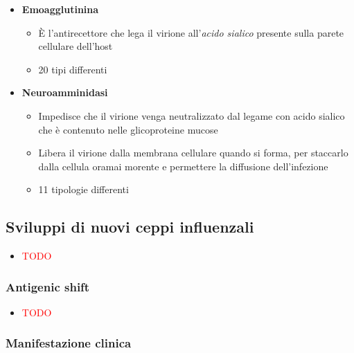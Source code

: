 \documentclass[italian,]{article}
\providecommand{\tightlist}{%
  \setlength{\itemsep}{0pt}\setlength{\parskip}{0pt}}
\newcommand{\TODO}[1]{\textcolor{red}{\textsf{\footnotesize{TODO #1}}}} %
\begin{document}
\begin{itemize}
\tightlist
\item
  \textbf{Emoagglutinina}

  \begin{itemize}
  \tightlist
  \item
    È l'antirecettore che lega il virione all'\emph{acido sialico}
    presente sulla parete cellulare dell'host
  \item
    20 tipi differenti
  \end{itemize}
\item
  \textbf{Neuroamminidasi}

  \begin{itemize}
  \tightlist
  \item
    Impedisce che il virione venga neutralizzato dal legame con acido
    sialico che è contenuto nelle glicoproteine mucose
  \item
    Libera il virione dalla membrana cellulare quando si forma, per
    staccarlo dalla cellula oramai morente e permettere la diffusione
    dell'infezione
  \item
    11 tipologie differenti
  \end{itemize}
\end{itemize}

\hypertarget{sviluppi-di-nuovi-ceppi-influenzali}{%
\subsection{Sviluppi di nuovi ceppi
influenzali}\label{sviluppi-di-nuovi-ceppi-influenzali}}

\begin{itemize}
\item
  \TODO{}
\end{itemize}

\hypertarget{antigenic-shift}{%
\subsubsection{Antigenic shift}\label{antigenic-shift}}

\begin{itemize}
\item
  \TODO{}
\end{itemize}

\hypertarget{manifestazione-clinica}{%
\subsubsection{Manifestazione clinica}\label{manifestazione-clinica}}
\end{document}
